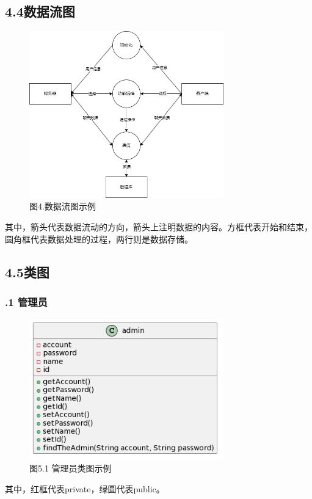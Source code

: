 \documentclass[24pt,a4paper]{article}%
\begin{document}
\subsection*{\songti 4.4数据流图}
\begin{figure}[H]
    \centering
    \includegraphics[width=0.75\textwidth]{images/dataStream.png}
    \caption*{图4.数据流图示例}
\end{figure}
其中，箭头代表数据流动的方向，箭头上注明数据的内容。方框代表开始和结束，圆角框代表数据处理的过程，两行则是数据存储。
\subsection*{\songti 4.5类图}
\subsubsection*{.1 管理员}
\begin{figure}[H]
    \centering
    \includegraphics[width=0.75\textwidth]{images/admin.png}
    \caption*{图5.1 管理员类图示例}
\end{figure}
其中，红框代表private，绿圆代表public。
\end{document}
